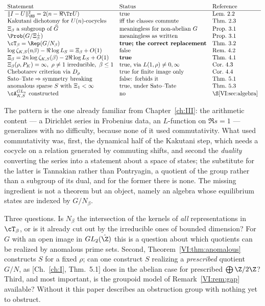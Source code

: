 \[
\begin{array}{lll}
\text{Statement} & \text{Status} & \text{Reference}\\\hline
\|I-U\|_{\HS}^2=2(n-\Re\Tr U) & \text{true} & \text{Lem.~2.2}\\
\text{Kakutani dichotomy for }U(n)\text{-cocycles} & \text{iff the classes commute} & \text{Thm.~2.3}\\
\Xi_\beta\ \text{a subgroup of }\widehat G & \text{meaningless for non-abelian }G & \text{Prop.~3.1}\\
\Prob(G/\Xi_\beta^\perp) & \text{meaningless as written} & \text{Prop.~3.1}\\
\cT_\beta=\Rep(G/N_\beta) & \textbf{true; the correct replacement} & \text{Thm.~3.2}\\
\log\zeta_{K,S}(n\beta)-\Re\log L_S=\Xi_\beta+O(1) & \text{false} & \text{Rem.~4.2}\\
\Xi_\beta=2n\log\zeta_{K,S}(\beta)-2\Re\log L_S+O(1) & \textbf{true} & \text{Thm.~4.1}\\
\Xi_\beta(\rho,P_K)=\infty,\ \rho\ne1\ \text{irreducible},\ \beta\le1 & \text{true, via }L(1,\rho)\ne0,\infty & \text{Cor.~4.3}\\
\text{Chebotarev criterion via }D_\rho & \text{true for finite image only} & \text{Cor.~4.4}\\
\text{Sato--Tate}\Rightarrow\text{symmetry breaking} & \text{false: forbids it} & \text{Thm.~5.1}\\
\text{anomalous sparse }S\ \text{with}\ \Xi_1<\infty & \text{true, under Sato--Tate} & \text{Thm.~5.3}\\
\cA^{GL_n}_{K,S}\ \text{constructed} & \text{no} & \S\ref{VI:sec:algebra}
\end{array}
\]

The pattern is the one already familiar from Chapter~\ref{ch:III}: the arithmetic
content --- a Dirichlet series in Frobenius data, an $L$-function on $\Re s=1$ ---
generalizes with no difficulty, because none of it used commutativity. What used
commutativity was, first, the dynamical half of the Kakutani step, which needs a cocycle
on a relation generated by commuting shifts, and second the \emph{duality} converting the
series into a statement about a space of states; the substitute for the latter is
Tannakian rather than Pontryagin, a quotient of the group rather than a subgroup of its
dual, and for the former there is none. The missing ingredient is not a theorem but an
object, namely an algebra whose equilibrium states are indexed by $G/N_\beta$.

Three questions. Is $N_\beta$ the intersection of the kernels of \emph{all} representations
in $\cT_\beta$, or is it already cut out by the irreducible ones of bounded dimension? For
$G$ with an open image in $GL_2(\hat\Z)$ this is a question about which quotients can be
realized by anomalous prime sets. Second, Theorem~\ref{VI:thm:anomalous} constructs
$S$ for a fixed $\rho$; can one construct $S$ realizing a \emph{prescribed} quotient
$G/N$, as [Ch.~\ref{ch:I}, Thm.~5.1] does in the abelian case for prescribed
$\bigoplus\Z/2\Z$? Third, and most important, is the groupoid model of Remark~\ref{VI:rem:gap}
available? Without it this paper describes an obstruction group with nothing yet to obstruct.

